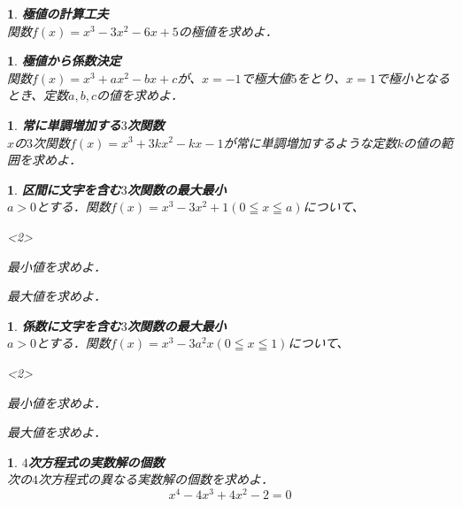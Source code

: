 \documentclass[10pt,
fleqn,
dvipdfmx,
uplatex
]{jsarticle}
\newtheorem{question}[Question]{}
\begin{document}
\begin{question}{\bf\boldmath 極値の計算工夫}\\
関数$f\left(x\right)=x^3-3x^2-6x+5$の極値を求めよ．
\end{question}



\begin{question}{\bf\boldmath 極値から係数決定}\\
関数$f\left(x\right)=x^3+ax^2-bx+c$が、$x=-1$で極大値$5$をとり、$x=1$で極小となるとき、定数$a,b,c$の値を求めよ．
\end{question}



\begin{question}{\bf\boldmath 常に単調増加する$3$次関数}\\
$x$の$3$次関数$f\left(x\right)=x^3+3kx^2-kx-1$が常に単調増加するような定数$k$の値の範囲を求めよ．
\end{question}



\begin{question}{\bf\boldmath 区間に文字を含む$3$次関数の最大最小}\\
$a>0$とする．関数$f\left(x\right)=x^3-3x^2+1\left(0\leqq x\leqq a\right)$について、
\begin{edaenumerate}<2>
\item 最小値を求めよ．
\item 最大値を求めよ．
\end{edaenumerate}

\end{question}



\begin{question}{\bf\boldmath 係数に文字を含む$3$次関数の最大最小}\\
$a>0$とする．関数$f\left(x\right)=x^3-3a^2x\left(0\leqq x\leqq 1\right)$について、
\begin{edaenumerate}<2>
\item 最小値を求めよ．
\item 最大値を求めよ．
\end{edaenumerate}

\end{question}



\begin{question}{\bf\boldmath $4$次方程式の実数解の個数}\\
次の$4$次方程式の異なる実数解の個数を求めよ．
\[x^4-4x^3+4x^2-2=0\]
\end{question}
\end{document}
